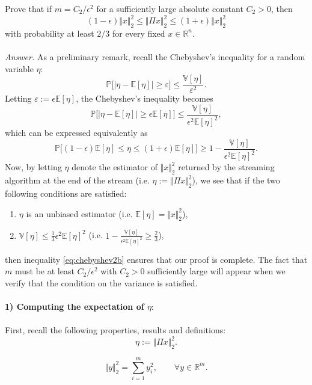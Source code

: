 \documentclass[10pt,usenames,dvipsnames]{article}
\newcommand{\R}{\mathbb{R}}
\newcommand{\Pbb}{\mathbb{P}}
\newcommand{\Ebb}{\mathbb{E}}
\newcommand{\Vbb}{\mathbb{V}}
\newenvironment{exercise}[2][Exercise]{\begin{trivlist}
  \item[\hskip \labelsep {\bfseries #1}\hskip \labelsep {\bfseries #2.}]}{\end{trivlist}}
\begin{document}
   \begin{exercise}{2b}
Prove that if $m = C_2/\epsilon^2$ for a sufficiently large absolute constant $C_2 > 0$, then 
$$
(1 - \epsilon)\Vert x \Vert_2^2 \leq \Vert \Pi x\Vert_2^2 \leq (1 + \epsilon) \Vert x\Vert_2^2
$$
with probability at least $2/3$ for every fixed $x \in \R^n$. 
\\ \\
\textit{Answer.}
As a preliminary remark, recall the Chebyshev's inequality for a random variable $\eta$:
$$
\Pbb \Big[ |\eta- \Ebb \left[\eta\right] | \geq \varepsilon \Big] \leq \frac{ \Vbb[ \eta]}{\varepsilon^2}.
$$
Letting $\varepsilon := \epsilon \Ebb[\eta]$, the Chebyshev's inequality becomes
$$
\Pbb\Big[ |\eta- \Ebb[\eta] | \geq  \epsilon \Ebb[\eta]\Big] \leq \frac{ \Vbb[\eta]}{ \epsilon^2 \Ebb[\eta]^2},
$$
which can be expressed equivalently as
\begin{equation}
\label{eq:chebyshev2b}
\Pbb\Big[(1 - \epsilon)\Ebb[\eta] \leq \eta \leq (1 + \epsilon) \Ebb[\eta]\Big] \geq 1 - \frac{ \Vbb[ \eta]}{ \epsilon^2 \Ebb[\eta]^2}.
\end{equation}
Now, by letting $\eta$ denote the estimator of $\Vert x \Vert_2^2$ returned by the streaming algorithm at the end of the stream (i.e. $\eta := \Vert \Pi x \Vert_2^2$), we see that if the two following conditions are satisfied:
\begin{enumerate}
	\item $\eta$ is an unbiased estimator (i.e. $\Ebb[\eta] = \Vert x \Vert_2^2$),
	\item $\Vbb[\eta] \leq \frac{1}{3} \epsilon^2 \Ebb[\eta]^2$ (i.e. $1 - \frac{ \Vbb[ \eta]}{ \epsilon^2 \Ebb[\eta]^2} \geq \frac{2}{3}$),
\end{enumerate}
then inequality \eqref{eq:chebyshev2b} ensures that our proof is complete. The fact that $m$ must be at least $C_2/\epsilon^2$ with $C_2 > 0$ sufficiently large will appear when we verify that the condition on the variance is satisfied.
		\\ \\
		\textbf{1) Computing the expectation of $\eta$}:
		\\ \\
		First, recall the following properties, results and definitions:
		\begin{equation}
		\label{eq:eta}
		\eta := \Vert \Pi x \Vert_2^2.
		\end{equation}
		
		\begin{equation}
		\label{eq:l2norm}
		\Vert y \Vert_2^2 = \sum_{i=1}^m y_i^2, \qquad \forall y \in \R^m.
		\end{equation}
		

\end{exercise}
\end{document}
